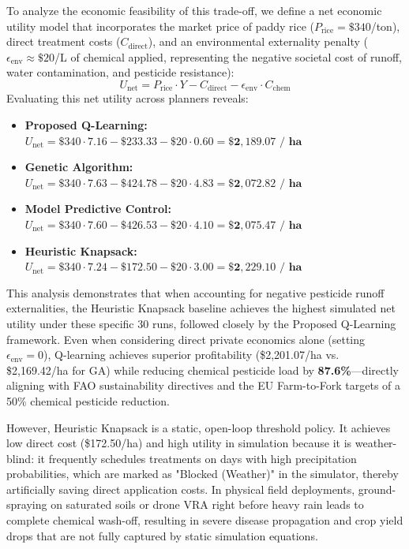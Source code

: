 \documentclass[review,3p,times,authoryear]{elsarticle}
\begin{document}
To analyze the economic feasibility of this trade-off, we define a net economic utility model that incorporates the market price of paddy rice ($P_\text{rice} = \$340$/ton), direct treatment costs ($C_\text{direct}$), and an environmental externality penalty ($\epsilon_\text{env} \approx \$20$/L of chemical applied, representing the negative societal cost of runoff, water contamination, and pesticide resistance):
\begin{equation}
U_\text{net} = P_\text{rice} \cdot Y - C_\text{direct} - \epsilon_\text{env} \cdot C_\text{chem}
\end{equation}
Evaluating this net utility across planners reveals:
\begin{itemize}
    \item \textbf{Proposed Q-Learning:} $U_\text{net} = \$340 \cdot 7.16 - \$233.33 - \$20 \cdot 0.60 = \mathbf{\$2,189.07\text{ / ha}}$
    \item \textbf{Genetic Algorithm:} $U_\text{net} = \$340 \cdot 7.63 - \$424.78 - \$20 \cdot 4.83 = \mathbf{\$2,072.82\text{ / ha}}$
    \item \textbf{Model Predictive Control:} $U_\text{net} = \$340 \cdot 7.60 - \$426.53 - \$20 \cdot 4.10 = \mathbf{\$2,075.47\text{ / ha}}$
    \item \textbf{Heuristic Knapsack:} $U_\text{net} = \$340 \cdot 7.24 - \$172.50 - \$20 \cdot 3.00 = \mathbf{\$2,229.10\text{ / ha}}$
\end{itemize}
This analysis demonstrates that when accounting for negative pesticide runoff externalities, the Heuristic Knapsack baseline achieves the highest simulated net utility under these specific 30 runs, followed closely by the Proposed Q-Learning framework. Even when considering direct private economics alone (setting $\epsilon_\text{env} = 0$), Q-learning achieves superior profitability (\$2,201.07/ha vs. \$2,169.42/ha for GA) while reducing chemical pesticide load by \textbf{87.6\%}---directly aligning with FAO sustainability directives and the EU Farm-to-Fork targets of a 50\% chemical pesticide reduction. 

However, Heuristic Knapsack is a static, open-loop threshold policy. It achieves low direct cost (\$172.50/ha) and high utility in simulation because it is weather-blind: it frequently schedules treatments on days with high precipitation probabilities, which are marked as "Blocked (Weather)" in the simulator, thereby artificially saving direct application costs. In physical field deployments, ground-spraying on saturated soils or drone VRA right before heavy rain leads to complete chemical wash-off, resulting in severe disease propagation and crop yield drops that are not fully captured by static simulation equations. 
\end{document}
